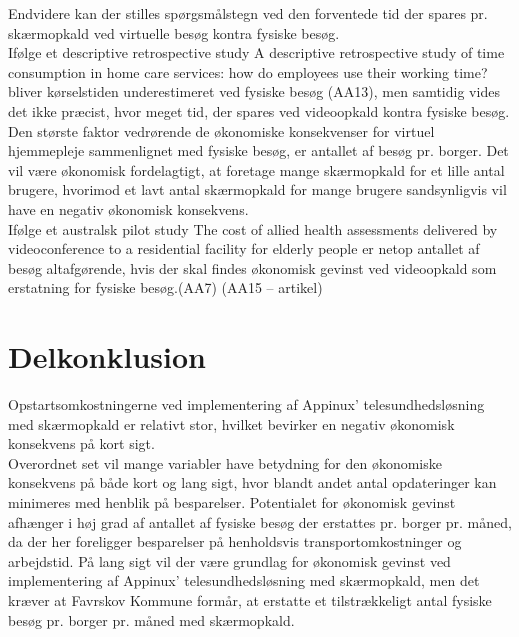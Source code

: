 Endvidere kan der stilles spørgsmålstegn ved den forventede tid der spares pr. skærmopkald ved virtuelle besøg kontra fysiske besøg.\\
Ifølge et descriptive retrospective study A descriptive retrospective study of time consumption in home care services: how do employees use their working time? bliver kørselstiden underestimeret ved fysiske besøg (AA13),  men samtidig vides det ikke præcist, hvor meget tid, der spares ved videoopkald kontra fysiske besøg.\\
Den største faktor vedrørende de økonomiske konsekvenser for virtuel hjemmepleje sammenlignet med fysiske besøg, er antallet af besøg pr. borger. Det vil være økonomisk fordelagtigt, at foretage mange skærmopkald for et lille antal brugere, hvorimod et lavt antal skærmopkald for mange brugere sandsynligvis vil have en negativ økonomisk konsekvens.\\
Ifølge et australsk pilot study The cost of allied health assessments delivered by videoconference to a residential facility for elderly people er netop antallet af besøg altafgørende, hvis der skal findes økonomisk gevinst ved videoopkald som erstatning for fysiske besøg.(AA7)
(AA15 – artikel)
\section{Delkonklusion}
Opstartsomkostningerne ved implementering af Appinux' telesundhedsløsning med skærmopkald er relativt stor, hvilket bevirker en negativ økonomisk konsekvens på kort sigt.\\
Overordnet set vil mange variabler have betydning for den økonomiske konsekvens på både kort og lang sigt, hvor blandt andet antal opdateringer kan minimeres med henblik på besparelser. 
Potentialet for økonomisk gevinst afhænger i høj grad af antallet af fysiske besøg der erstattes pr. borger pr. måned, da der her foreligger besparelser på henholdsvis transportomkostninger og arbejdstid.
På lang sigt vil der være grundlag for økonomisk gevinst ved implementering af Appinux’ telesundhedsløsning med skærmopkald, men det kræver at Favrskov Kommune formår, at erstatte et tilstrækkeligt antal fysiske besøg pr. borger pr. måned med skærmopkald.